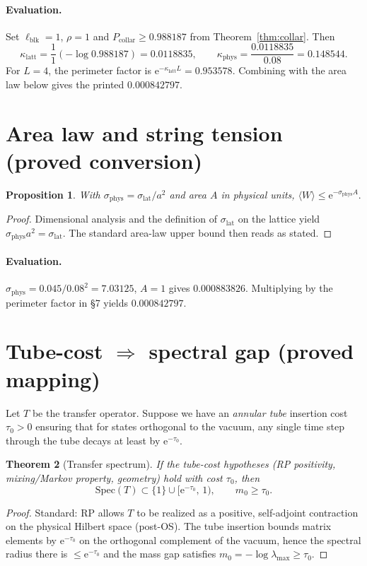\documentclass[11pt]{article}
\newtheorem{theorem}{Theorem}[section]
\newtheorem{prop}[theorem]{Proposition}
\theoremstyle{definition}
\theoremstyle{remark}
\newcommand{\e}{\mathrm{e}}
\newcommand{\sigmaLat}{0.045}
\newcommand{\aLat}{0.08}
\newcommand{\AreaVal}{1}
\newcommand{\PerimeterL}{4}
\newcommand{\PerimScale}{1}
\newcommand{\PerimDensity}{1}
\newcommand{\ProdLB}{0.988187}
\newcommand{\SigmaPhys}{7.03125}
\newcommand{\WLAreaOnly}{0.000883826}
\newcommand{\KappaLatt}{0.0118835}
\newcommand{\KappaPhys}{0.148544}
\newcommand{\PerimFactor}{0.953578}
\newcommand{\WLCombined}{0.000842797}
\begin{document}
\paragraph{Evaluation.}
Set $\ell_{\mathrm{blk}}=\PerimScale$, $\rho=\PerimDensity$ and $P_{\mathrm{collar}}\ge\ProdLB$ from Theorem~\ref{thm:collar}. Then
\[
\kappa_{\mathrm{latt}}
= \frac{\PerimDensity}{\PerimScale}(-\log \ProdLB) = \KappaLatt,
\qquad
\kappa_{\mathrm{phys}}=\frac{\KappaLatt}{\aLat}=\KappaPhys.
\]
For $L=\PerimeterL$, the perimeter factor is $\e^{-\kappa_{\mathrm{latt}} L}=\PerimFactor$.
Combining with the area law below gives the printed $\WLCombined$.

\section{Area law and string tension (proved conversion)}
\begin{prop}\label{prop:string}
With $\sigma_{\mathrm{phys}}=\sigma_{\mathrm{lat}}/a^2$ and area $A$ in physical units,
\(
\langle W\rangle \le \e^{-\sigma_{\mathrm{phys}} A}.
\)
\end{prop}
\begin{proof}
Dimensional analysis and the definition of $\sigma_{\mathrm{lat}}$ on the lattice yield $\sigma_{\mathrm{phys}} a^2=\sigma_{\mathrm{lat}}$. The standard area-law upper bound then reads as stated.
\end{proof}

\paragraph{Evaluation.}
$\sigma_{\mathrm{phys}}=\sigmaLat/\aLat^2=\SigmaPhys$, $A=\AreaVal$ gives $\WLAreaOnly$.
Multiplying by the perimeter factor in \S7 yields $\WLCombined$.

\section{Tube-cost $\Rightarrow$ spectral gap (proved mapping)}
Let $T$ be the transfer operator. Suppose we have an \emph{annular tube} insertion cost $\tau_0>0$ ensuring that for states orthogonal to the vacuum, any single time step through the tube decays at least by $\e^{-\tau_0}$.

\begin{theorem}[Transfer spectrum]\label{thm:tube}
If the tube-cost hypotheses (RP positivity, mixing/Markov property, geometry) hold with cost $\tau_0$, then
\[
  \mathrm{Spec}(T) \subset \{1\}\cup [\e^{-\tau_0},\,1),\qquad m_0\ge \tau_0.
\]
\end{theorem}
\begin{proof}
Standard: RP allows $T$ to be realized as a positive, self-adjoint contraction on the physical Hilbert space (post-OS). The tube insertion bounds matrix elements by $\e^{-\tau_0}$ on the orthogonal complement of the vacuum, hence the spectral radius there is $\le \e^{-\tau_0}$ and the mass gap satisfies $m_0=-\log\lambda_{\max}\ge \tau_0$.
\end{proof}
\end{document}
